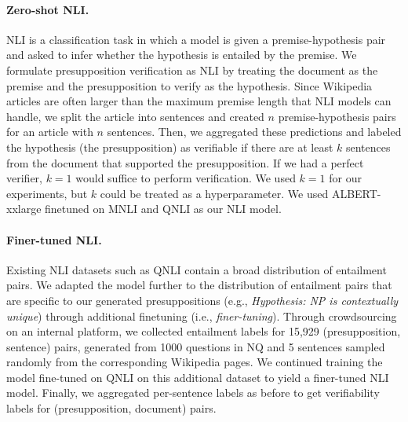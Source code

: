 \documentclass[11pt,a4paper]{article}
\begin{document}
\paragraph{Zero-shot NLI.} NLI is a classification task in which a model is given a premise-hypothesis pair and asked to infer whether the hypothesis is entailed by the premise. We formulate presupposition verification as NLI by treating the document as the premise and the presupposition to verify as the hypothesis. Since Wikipedia articles are often larger than the maximum premise length that NLI models can handle, we split the article into sentences and created $n$ premise-hypothesis pairs for an article with $n$ sentences. Then, we aggregated these predictions and labeled the hypothesis (the presupposition) as verifiable if there are at least $k$ sentences from the document that supported the presupposition. If we had a perfect verifier, $k=1$ would suffice to perform verification. We used $k=1$ for our experiments, but $k$ could be treated as a hyperparameter. We used ALBERT-xxlarge \citep{Lan2020ALBERT} finetuned on MNLI \citep{williams-etal-2018-broad} and QNLI \citep{wang2018glue} as our NLI model.

\paragraph{Finer-tuned NLI.} Existing NLI datasets such as QNLI contain a broad distribution of entailment pairs. We adapted the model further to the distribution of entailment pairs that are specific to our generated presuppositions (e.g., \textit{Hypothesis: NP is contextually unique}) through additional finetuning (i.e., \textit{finer-tuning}). Through crowdsourcing on an internal platform, we collected entailment labels for 15,929 (presupposition, sentence) pairs, generated from 1000 questions in NQ and 5 sentences sampled randomly from the corresponding Wikipedia pages. We continued training the model fine-tuned on QNLI on this additional dataset to yield a finer-tuned NLI model. Finally, we aggregated per-sentence labels as before to get verifiability labels for (presupposition, document) pairs.
\end{document}
